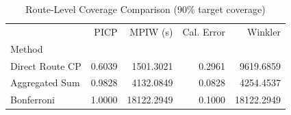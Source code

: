 \begin{table}
\caption{Route-Level Coverage Comparison (90\% target coverage)}
\label{tab:t61_route_coverage}
\begin{tabular}{lrrrr}
\toprule
 & PICP & MPIW (s) & Cal. Error & Winkler \\
Method &  &  &  &  \\
\midrule
Direct Route CP & 0.6039 & 1501.3021 & 0.2961 & 9619.6859 \\
Aggregated Sum & 0.9828 & 4132.0849 & 0.0828 & 4254.4537 \\
Bonferroni & 1.0000 & 18122.2949 & 0.1000 & 18122.2949 \\
\bottomrule
\end{tabular}
\end{table}




